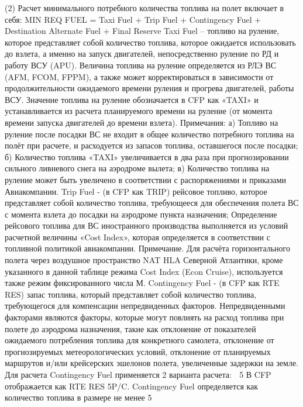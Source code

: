 (2) Расчет минимального потребного количества топлива на полет включает в себя:
MIN REQ FUEL = Taxi Fuel + Trip Fuel + Contingency Fuel + Destination Alternate Fuel + Final Reserve
Taxi Fuel – топливо на руление, которое представляет собой количество топлива, которое ожидается использовать до взлета, а именно на запуск двигателей, непосредственно руление по РД и работу ВСУ (APU).
Величина топлива на руление определяется из РЛЭ ВС (AFM, FCOM, FPPM), а также может корректироваться в зависимости от продолжительности ожидаемого времени руления и прогрева двигателей, работы ВСУ.
Значение топлива на руление обозначается в CFP как «TAXI» и устанавливается из расчета планируемого времени на руление (от момента времени запуска двигателей до времени взлета).
Примечания:
а)	Топливо на руление после посадки ВС не входит в общее количество потребного топлива на полёт при расчете, и расходуется из запасов топлива, оставшегося после посадки;
б)	Количество топлива «TAXI» увеличивается в два раза при прогнозировании сильного ливневого снега на аэродроме вылета;
в)	Количество топлива на руление может быть увеличено в соответствии с распоряжениями и приказами Авиакомпании.
Trip Fuel - (в CFP как TRIP) рейсовое топливо, которое представляет собой количество топлива, требующееся для обеспечения полета ВС с момента взлета до посадки на аэродроме пункта назначения;
Определение рейсового топлива для ВС иностранного производства выполняется из условий расчетной величины «Cost Index», которая определяется в соответствии с топливной политикой авиакомпании. 
Примечание. Для расчёта горизонтального полета через воздушное пространство NAT HLA Северной Атлантики, кроме указанного в данной таблице режима Cost Index (Econ Cruise), используется также режим фиксированного числа М.
Contingency Fuel - (в CFP как RTE RES) запас топлива, который представляет собой количество топлива, требующегося для компенсации непредвиденных факторов. 
Непредвиденными факторами являются факторы, которые могут повлиять на расход топлива при полете до аэродрома назначения, такие как отклонение от показателей ожидаемого потребления топлива для конкретного самолета, отклонение от прогнозируемых метеорологических условий, отклонение от планируемых маршрутов и/или крейсерских эшелонов полета, увеличенные задержки на земле. 
Для расчета Contingency Fuel применяется 2 варианта расчета: 
 5%
В CFP отображается как RTE RES 5P/C. Contingency Fuel определяется как количество топлива в размере не менее 5 %
